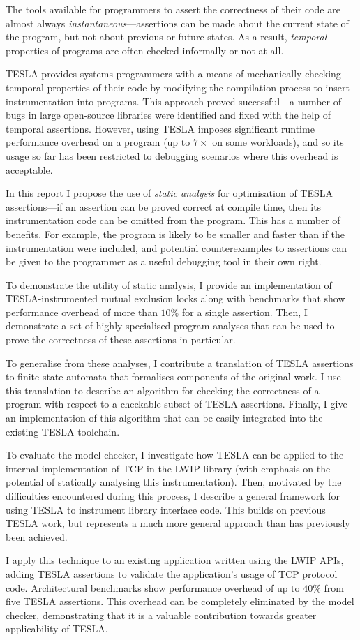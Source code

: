 The tools available for programmers to assert the correctness of their code are
almost always \emph{instantaneous}---assertions can be made about the current
state of the program, but not about previous or future states. As a result,
\emph{temporal} properties of programs are often checked informally or not at
all.

TESLA \cite{anderson_tesla:_2014} provides systems programmers with a means of
mechanically checking temporal properties of their code by modifying the
compilation process to insert instrumentation into programs. This approach
proved successful---a number of bugs in large open-source libraries were
identified and fixed with the help of temporal assertions. However, using TESLA
imposes significant runtime performance overhead on a program (up to $7\times$
on some workloads), and so its usage so far has been restricted to debugging
scenarios where this overhead is acceptable.

In this report I propose the use of \emph{static analysis} for optimisation of
TESLA assertions---if an assertion can be proved correct at compile time, then
its instrumentation code can be omitted from the program. This has a number of
benefits. For example, the program is likely to be smaller and faster than if
the instrumentation were included, and potential counterexamples to assertions
can be given to the programmer as a useful debugging tool in their own right.

To demonstrate the utility of static analysis, I provide an implementation of
TESLA-instrumented mutual exclusion locks along with benchmarks that show
performance overhead of more than $10\%$ for a single assertion. Then, I
demonstrate a set of highly specialised program analyses that can be used to
prove the correctness of these assertions in particular. 

To generalise from these analyses, I contribute a translation of TESLA
assertions to finite state automata that formalises components of the original
work. I use this translation to describe an algorithm for checking the
correctness of a program with respect to a checkable subset of TESLA assertions.
Finally, I give an implementation of this algorithm that can be easily
integrated into the existing TESLA toolchain.

To evaluate the model checker, I investigate how TESLA can be applied to the
internal implementation of TCP in the LWIP library \cite{dunkels_design_2001}
(with emphasis on the potential of statically analysing this instrumentation).
Then, motivated by the difficulties encountered during this process, I describe
a general framework for using TESLA to instrument library interface code. This
builds on previous TESLA work, but represents a much more general approach than
has previously been achieved.

I apply this technique to an existing application written using the LWIP APIs,
adding TESLA assertions to validate the application's usage of TCP protocol
code. Architectural benchmarks show performance overhead of up to $40\%$ from
five TESLA assertions. This overhead can be completely eliminated by the model
checker, demonstrating that it is a valuable contribution towards greater
applicability of TESLA.
